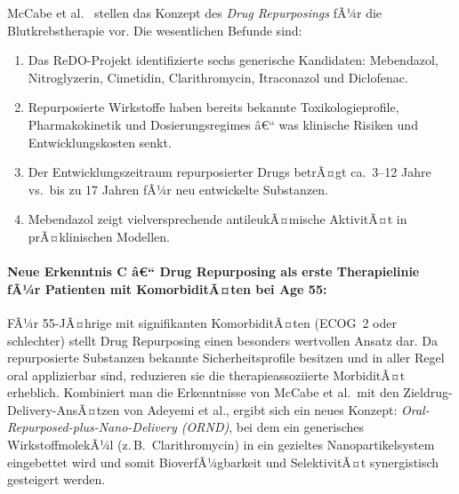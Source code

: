 ﻿\documentclass[12pt,a4paper]{article}
\theoremstyle{definition}
\begin{document}
McCabe et al.\ \cite{mccabe2015} stellen das Konzept des \emph{Drug Repurposings}
fÃ¼r die Blutkrebstherapie vor. Die wesentlichen Befunde sind:
\begin{enumerate}
  \item Das ReDO-Projekt identifizierte sechs generische Kandidaten: Mebendazol,
        Nitroglyzerin, Cimetidin, Clarithromycin, Itraconazol und Diclofenac.
  \item Repurposierte Wirkstoffe haben bereits bekannte Toxikologieprofile,
        Pharmakokinetik und Dosierungsregimes â€“ was klinische Risiken und
        Entwicklungskosten senkt.
  \item Der Entwicklungszeitraum repurposierter Drugs betrÃ¤gt ca.\ 3--12 Jahre
        vs.\ bis zu 17 Jahren fÃ¼r neu entwickelte Substanzen.
  \item Mebendazol zeigt vielversprechende antileukÃ¤mische AktivitÃ¤t in
        prÃ¤klinischen Modellen.
\end{enumerate}

\paragraph{Neue Erkenntnis C â€“ Drug Repurposing als erste Therapielinie fÃ¼r
Patienten mit KomorbiditÃ¤ten bei Age 55:}
FÃ¼r 55-JÃ¤hrige mit signifikanten KomorbiditÃ¤ten (ECOG~2 oder schlechter) stellt
Drug Repurposing einen besonders wertvollen Ansatz dar. Da repurposierte Substanzen
bekannte Sicherheitsprofile besitzen und in aller Regel oral applizierbar sind,
reduzieren sie die therapieassoziierte MorbiditÃ¤t erheblich. Kombiniert man die
Erkenntnisse von McCabe et al.\ mit den Zieldrug-Delivery-AnsÃ¤tzen von Adeyemi et
al., ergibt sich ein neues Konzept: \emph{Oral-Repurposed-plus-Nano-Delivery
(ORND)}, bei dem ein generisches WirkstoffmolekÃ¼l (z.\,B.\ Clarithromycin) in ein
gezieltes Nanopartikelsystem eingebettet wird und somit BioverfÃ¼gbarkeit und
SelektivitÃ¤t synergistisch gesteigert werden.
\end{document}
